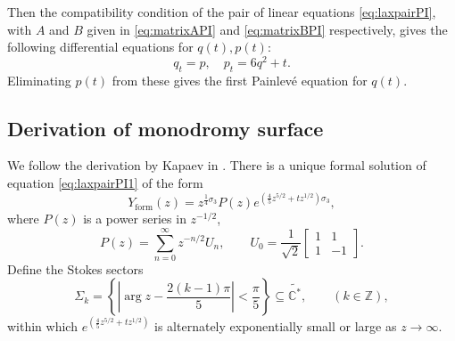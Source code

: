 \documentclass[a4paper,reqno]{amsart}
\numberwithin{equation}{section}
\newcommand{\Z}{\mathbb{Z}}
\newcommand{\C}{\mathbb{C}}
\numberwithin{equation}{section}
\begin{document}
Then the compatibility condition of the pair of linear equations \eqref{eq:laxpairPI}, with $A$ and $B$ given in \eqref{eq:matrixAPI} and \eqref{eq:matrixBPI} respectively, gives the following differential equations for $q(t),p(t)$:
\begin{equation*}
    q_t = p, \quad p_t = 6 q^2 + t.
\end{equation*}
Eliminating $p(t)$ from these gives the first Painlev\'e equation for $q(t)$.










\subsection{Derivation of monodromy surface}



We follow the derivation by Kapaev in \cite{kapaev2004}.
There is a unique formal solution of equation \eqref{eq:laxpairPI1} of the form
$$ Y_{\operatorname{form}}(z) = z^{\frac{1}{4} \sigma_3}P(z) e^{( \frac{4}{5} z^{5/2} + t z^{1/2})\sigma_3},$$
where $P(z)$ is a power series in $z^{-1/2}$,
$$P(z) =  \sum_{n=0}^{\infty} z^{-n/2} U_n, \qquad U_0 =\frac{1}{\sqrt{2}}\begin{bmatrix}
    1 & 1 \\
    1 & -1 
\end{bmatrix}.$$
Define the Stokes sectors
$$ \Sigma_k =\left\{ \left| \operatorname{arg}z - \frac{2(k-1)\pi}{5}\right| < \frac{\pi}{5} \right\} \subseteq\widetilde{\C^*} , \qquad (k\in\Z), $$
within which $e^{( \frac{4}{5} z^{5/2} + t z^{1/2})}$ is alternately exponentially small or large as $z\to\infty$.
\end{document}

